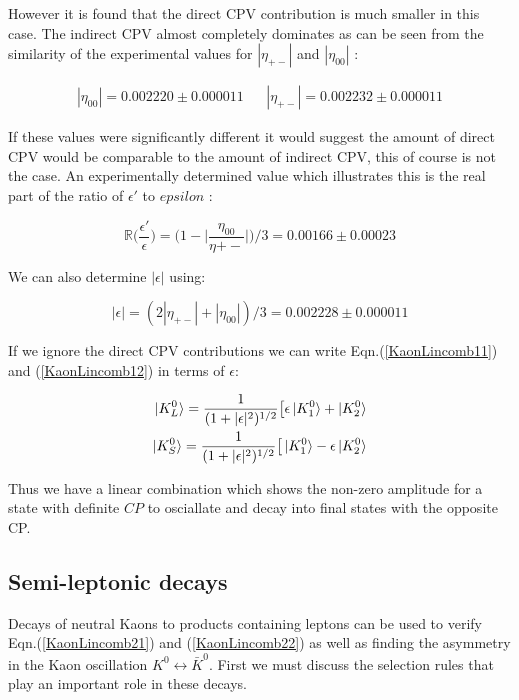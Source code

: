\noindent However it is found that the direct CPV contribution is much smaller in this case. The indirect CPV almost completely dominates as can be seen from the similarity of the experimental values for $|\eta_{+-}|$ and $|\eta_{00}|$ \cite{PDGKaons}:

\begin{align*}
|\eta_{00}| = 0.002220 \pm 0.000011 &  & |\eta_{+-}| = 0.002232 \pm 0.000011 
\end{align*}  

\noindent If these values were significantly different it would suggest the amount of direct CPV would be comparable to the amount of indirect CPV, this of course is not the case. An experimentally determined value which illustrates this is the real part of the ratio of $\epsilon'$ to $epsilon$ \cite{PDGKaons}:

\begin{equation*}
\mathbb{R} \big(\frac{\epsilon'}{\epsilon} \big)  = \big(1 - \big|\frac{\eta_{00}}{\eta{+-}}\big|\big) / 3 = 0.00166 \pm 0.00023
\end{equation*}

\noindent We can also determine $|\epsilon|$ using:

\begin{equation*} 
|\epsilon| = (2 |\eta_{+-}| + |\eta_{00}|)/3 = 0.002228 \pm 0.000011
\end{equation*} 


\noindent If we ignore the direct CPV contributions we can write Eqn.(\ref{KaonLincomb11}) and (\ref{KaonLincomb12}) in terms of $\epsilon$:

\begin{align}
\label{KaonLincomb21}
\ket{K^{0}_{L}} = \frac{1}{(1+|\epsilon|^2)^{1/2}} \big[ \epsilon \ket{K^{0}_{1}} + \ket{K^{0}_{2}} \\
\label{KaonLincomb22}
\ket{K^{0}_{S}} = \frac{1}{(1+|\epsilon|^2)^{1/2}} \big[ \ket{K^{0}_{1}} - \epsilon \ket{K^{0}_{2}}
\end{align}

\noindent Thus we have a linear combination which shows the non-zero amplitude for a state with definite $CP$ to osciallate and decay into final states with the opposite CP.

\subsection{Semi-leptonic decays}\label{Kevin:Kaon_semileptonic}

Decays of neutral Kaons to products containing leptons can be used to verify Eqn.(\ref{KaonLincomb21}) and (\ref{KaonLincomb22}) as well as finding the asymmetry in the Kaon oscillation $K^{0} \leftrightarrow \bar{K}^{0}$. First we must discuss the selection rules that play an important role in these decays.

